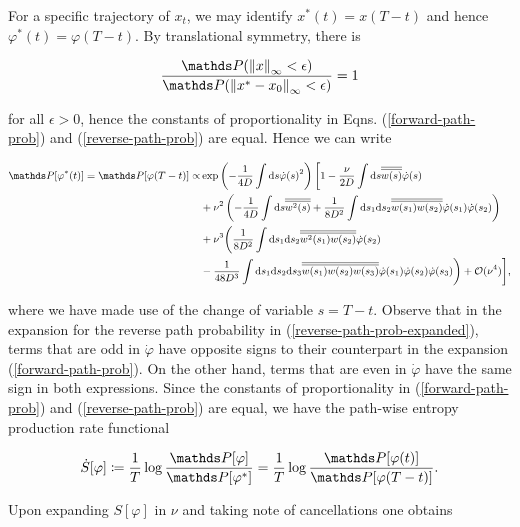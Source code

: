 For a specific trajectory of $x_t$, we may identify $x^\ast(t) = x(T-t)$ and hence $\varphi^\ast(t) = \varphi(T-t)$. By translational symmetry, there is

\begin{align}
\frac{\bP(\norm{x}_\infty < \epsilon) }{\bP(\norm{x^\ast-x_0}_\infty < \epsilon)} = 1
\end{align}

for all $\epsilon > 0$, hence the constants of proportionality in Eqns. (\ref{forward-path-prob}) and (\ref{reverse-path-prob}) are equal. Hence we can write 

\begin{align}\label{reverse-path-prob-expanded}
\small
\begin{split}
\bP[\varphi^\ast(t)] = \bP[\varphi(T-t)] \propto &\exp \left(-\frac{1}{4D} \int \rmd s \dot{\varphi}(s)^2 \right) \bigg[1-\frac{\nu}{2D}\int \rmd s \Overline{w(s)}\dot{\varphi}(s) \\ &+ \nu^2 \left(-\frac{1}{4D}\int \rmd s \Overline{w^2(s)} + \frac{1}{8D^2}\int \rmd s_1 \rmd s_2 \Overline{w(s_1)w(s_2)}\dot{\varphi}(s_1)\dot{\varphi}(s_2)\right) \\
     &+ \nu^3 \bigg( \frac{1}{8D^2}\int \rmd s_1\rmd s_2 \Overline{w^2(s_1)w(s_2)}\dot{\varphi}(s_2) \\&- \frac{1}{48D^3}\int \rmd s_1 \rmd s_2 \rmd s_3 \Overline{w(s_1)w(s_2)w(s_3)}\dot{\varphi}(s_1)\dot{\varphi}(s_2)\dot{\varphi}(s_3)\bigg) + \mathcal{O}(\nu^4) \bigg],
\end{split}
\end{align}

where we have made use of the change of variable $s = T-t$. Observe that in the expansion for the reverse path probability in (\ref{reverse-path-prob-expanded}), terms that are odd in $\dot{\varphi}$ have opposite signs to their counterpart in the expansion (\ref{forward-path-prob}). On the other hand, terms that are even in $\dot{\varphi}$ have the same sign in both expressions. Since the constants of proportionality in (\ref{forward-path-prob}) and (\ref{reverse-path-prob}) are equal, we have the path-wise entropy production rate functional

\begin{align}
\dot{S}[\varphi]  \coloneqq \frac{1}{T}\log \frac{\bP[\varphi]}{\bP[\varphi^\ast]} = \frac{1}{T}\log \frac{\bP[\varphi(t)]}{\bP[\varphi(T-t)]}.
\end{align}

Upon expanding $S[\varphi]$ in $\nu$ and taking note of cancellations one obtains 

